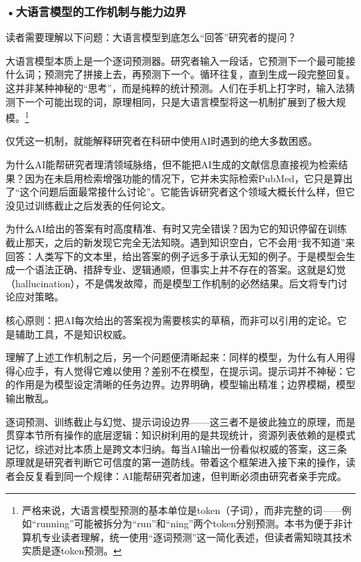 \subsubsection*{\textbf{•大语言模型的工作机制与能力边界}}

读者需要理解以下问题：大语言模型到底怎么``回答''研究者的提问？

大语言模型本质上是一个逐词预测器。研究者输入一段话，它预测下一个最可能接什么词；预测完了拼接上去，再预测下一个。循环往复，直到生成一段完整回复。这并非某种神秘的``思考''，而是纯粹的统计预测。人们在手机上打字时，输入法猜测下一个可能出现的词，原理相同，只是大语言模型将这一机制扩展到了极大规模。\footnote{严格来说，大语言模型预测的基本单位是token（子词），而非完整的词——例如``running''可能被拆分为``run''和``ning''两个token分别预测。本书为便于非计算机专业读者理解，统一使用``逐词预测''这一简化表述，但读者需知晓其技术实质是逐token预测。}

仅凭这一机制，就能解释研究者在科研中使用AI时遇到的绝大多数困惑。

为什么AI能帮研究者理清领域脉络，但不能把AI生成的文献信息直接视为检索结果？因为在未启用检索增强功能的情况下，它并未实际检索PubMed，它只是算出了``这个问题后面最常接什么讨论''。它能告诉研究者这个领域大概长什么样，但它没见过训练截止之后发表的任何论文。

为什么AI给出的答案有时高度精准、有时又完全错误？因为它的知识停留在训练截止那天，之后的新发现它完全无法知晓。遇到知识空白，它不会用``我不知道''来回答：人类写下的文本里，给出答案的例子远多于承认无知的例子。于是模型会生成一个语法正确、措辞专业、逻辑通顺，但事实上并不存在的答案。这就是幻觉（hallucination），不是偶发故障，而是模型工作机制的必然结果。后文将专门讨论应对策略。

核心原则：把AI每次给出的答案视为需要核实的草稿，而非可以引用的定论。它是辅助工具，不是知识权威。

理解了上述工作机制之后，另一个问题便清晰起来：同样的模型，为什么有人用得得心应手，有人觉得它难以使用？差别不在模型，在提示词。提示词并不神秘：它的作用是为模型设定清晰的任务边界。边界明确，模型输出精准；边界模糊，模型输出散乱。

逐词预测、训练截止与幻觉、提示词设边界——这三者不是彼此独立的原理，而是贯穿本节所有操作的底层逻辑：知识树利用的是共现统计，资源列表依赖的是模式记忆，综述对比本质上是跨文本归纳。每当AI输出一份看似权威的答案，这三条原理就是研究者判断它可信度的第一道防线。带着这个框架进入接下来的操作，读者会反复看到同一个规律：AI能帮研究者加速，但判断必须由研究者亲手完成。

